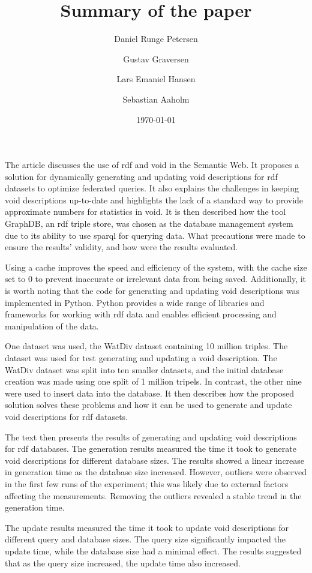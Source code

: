 \documentclass[a4paper]{article}
\title{Summary of the paper}
\date{\today}
\author{Daniel Runge Petersen \and Gustav Graversen \and Lars Emaniel Hansen \and Sebastian Aaholm }
\begin{document}
\maketitle
\thispagestyle{empty}

The article discusses the use of \gls{rdf} and \gls{void} in the Semantic Web. It proposes a solution for dynamically generating and updating \gls{void} descriptions for \gls{rdf} datasets to optimize federated queries. It also explains the challenges in keeping \gls{void} descriptions up-to-date and highlights the lack of a standard way to provide approximate numbers for statistics in \gls{void}. It is then described how the tool GraphDB, an \gls{rdf} triple store, was chosen as the database management system due to its ability to use \gls{sparql} for querying data. What precautions were made to ensure the results' validity, and how were the results evaluated.

Using a cache improves the speed and efficiency of the system, with the cache size set to 0 to prevent inaccurate or irrelevant data from being saved. Additionally, it is worth noting that the code for generating and updating \gls{void} descriptions was implemented in Python. Python provides a wide range of libraries and frameworks for working with \gls{rdf} data and enables efficient processing and manipulation of the data.

One dataset was used, the WatDiv dataset containing 10 million triples. The dataset was used for test generating and updating a \gls{void} description. The WatDiv dataset was split into ten smaller datasets, and the initial database creation was made using one split of 1 million tripels. In contrast, the other nine were used to insert data into the database. It then describes how the proposed solution solves these problems and how it can be used to generate and update \gls{void} descriptions for \gls{rdf} datasets.

The text then presents the results of generating and updating \gls{void} descriptions for \gls{rdf} databases. The generation results measured the time it took to generate \gls{void} descriptions for different database sizes. The results showed a linear increase in generation time as the database size increased. However, outliers were observed in the first few runs of the experiment; this was likely due to external factors affecting the measurements. Removing the outliers revealed a stable trend in the generation time.

The update results measured the time it took to update \gls{void} descriptions for different query and database sizes. The query size significantly impacted the update time, while the database size had a minimal effect. The results suggested that as the query size increased, the update time also increased.
\end{document}
